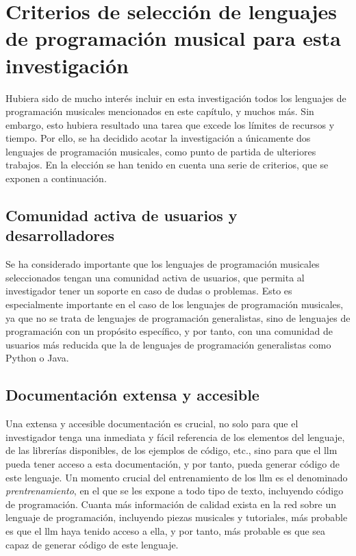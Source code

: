 \section{Criterios de selección de lenguajes de programación musical para esta investigación}

Hubiera sido de mucho interés incluir en esta investigación todos los lenguajes de programación musicales mencionados en este capítulo, y muchos más. Sin embargo, esto hubiera resultado una tarea que excede los límites de recursos y tiempo. Por ello, se ha decidido acotar la investigación a únicamente dos lenguajes de programación musicales, como punto de partida de ulteriores trabajos. En la elección se han tenido en cuenta una serie de criterios, que se exponen a continuación.


\subsection{Comunidad activa de usuarios y desarrolladores} 
Se ha considerado importante que los lenguajes de programación musicales seleccionados tengan una comunidad activa de usuarios, que permita al investigador tener un soporte en caso de dudas o problemas. Esto es especialmente importante en el caso de los lenguajes de programación musicales, ya que no se trata de lenguajes de programación generalistas, sino de lenguajes de programación con un propósito específico, y por tanto, con una comunidad de usuarios más reducida que la de lenguajes de programación generalistas como Python o Java.

\subsection{Documentación extensa y accesible}
Una extensa y accesible documentación es crucial, no solo para que el investigador tenga una inmediata y fácil referencia de los elementos del lenguaje, de las librerías disponibles, de los ejemplos de código, etc., sino para que el \gls{llm} pueda tener acceso a esta documentación, y por tanto, pueda generar código de este lenguaje. Un momento crucial del entrenamiento de los \gls{llm} es el denominado \emph{prentrenamiento}, en el que se les expone a todo tipo de texto, incluyendo código de programación. Cuanta más información de calidad exista en la red sobre un lenguaje de programación, incluyendo piezas musicales y tutoriales, más probable es que el \gls{llm} haya tenido acceso a ella, y por tanto, más probable es que sea capaz de generar código de este lenguaje.

